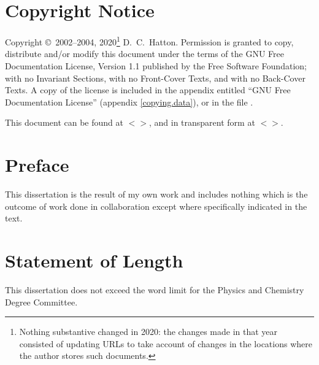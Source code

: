 \chapter*{Copyright Notice}

Copyright \copyright\ 2002--2004, 2020\footnote{Nothing substantive
  changed in 2020: the changes made in that year consisted of updating
  URLs to take account of changes in the locations where the author
  stores such documents.} D.\ {}C.\ {}Hatton.  Permission is granted
to copy, distribute and/or modify this document under the terms of the
GNU Free Documentation License, Version 1.1 published by the Free
Software Foundation; with no Invariant Sections, with no Front-Cover
Texts, and with no Back-Cover Texts.  A copy of the license is
included in the appendix entitled ``GNU Free Documentation License''
(appendix \ref{copying.data}), or in the file .

This document can be found at
$<$$>$,
and in transparent form at
$<$$>$.

\chapter*{Preface}

This dissertation is the result of my own work and includes nothing
which is the outcome of work done in collaboration except where
specifically indicated in the text.

\chapter*{Statement of Length}

This dissertation does not exceed the word limit for the Physics and
Chemistry Degree Committee.
